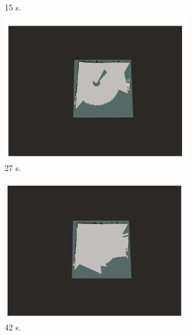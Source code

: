 \documentclass[11pt,openany]{book}
\begin{document}
\begin{figure}[H]
\begin{subfigure}[H]{0.3\linewidth}
        \caption{{15 s.}}
        \label{fig:4.12b}
    \end{subfigure}
    \begin{subfigure}[H]{0.3\linewidth}
        \includegraphics[width=\linewidth]{assets/4_12_c.png}
        \caption{{27 s.}}
        \label{fig:4.12c}
    \end{subfigure}
    \begin{subfigure}[H]{0.3\linewidth}
        \includegraphics[width=\linewidth]{assets/4_12_d.png}
        \caption{{42 s.}}
        \label{fig:4.12d}
    \end{subfigure}
    \begin{subfigure}[H]{0.3\linewidth}

\end{subfigure}
\end{figure}
\end{document}

